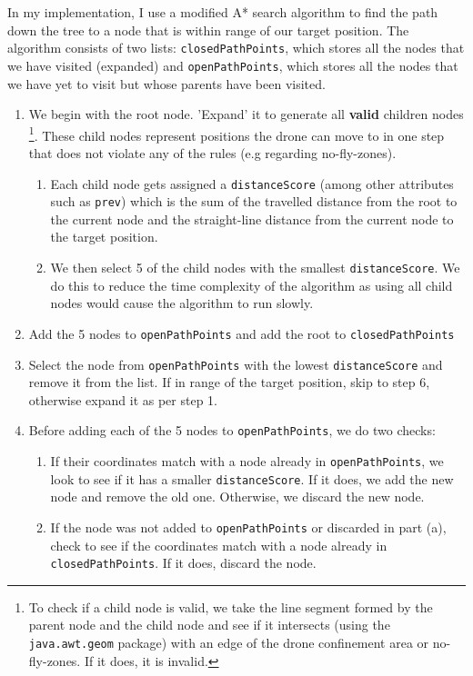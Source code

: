 \documentclass[11pt]{article}
\begin{document}
In my implementation, I use a modified A* search algorithm to find the path down the tree to a node that is within range of our target position. The algorithm consists of two lists: \texttt{closedPathPoints}, which stores all the nodes that we have visited (expanded) and \texttt{openPathPoints}, which stores all the nodes that we have yet to visit but whose parents have been visited.
\begin{enumerate}[topsep=0pt, itemsep=0pt]
  \item We begin with the root node. 'Expand' it to generate all \textbf{valid} children nodes \footnote{To check if a child node is valid, we take the line segment formed by the parent node and the child node and see if it intersects (using the \texttt{java.awt.geom} package) with an edge of the drone confinement area or no-fly-zones. If it does, it is invalid.}. These child nodes represent positions the drone can move to in one step that does not violate any of the rules (e.g regarding no-fly-zones).
  \begin{enumerate}[topsep=0pt, itemsep=0pt]
      \item Each child node gets assigned a \texttt{distanceScore} (among other attributes such as \texttt{prev}) which is the sum of the travelled distance from the root to the current node and the straight-line distance from the current node to the target position.
      \item We then select 5 of the child nodes with the smallest \texttt{distanceScore}. We do this to reduce the time complexity of the algorithm as using all child nodes would cause the algorithm to run slowly.
  \end{enumerate}
  
  \item Add the 5 nodes to \texttt{openPathPoints} and add the root to \texttt{closedPathPoints}
  
  \item Select the node from \texttt{openPathPoints} with the lowest \texttt{distanceScore} and remove it from the list. If in range of the target position, skip to step 6, otherwise expand it as per step 1.
  
  \item Before adding each of the 5 nodes to \texttt{openPathPoints}, we do two checks:
  \begin{enumerate}[topsep=0pt, itemsep=0pt]
      \item If their coordinates match with a node already in \texttt{openPathPoints}, we look to see if it has a smaller \texttt{distanceScore}. If it does, we add the new node and remove the old one. Otherwise, we discard the new node.
      \item If the node was not added to \texttt{openPathPoints} or discarded in part (a), check to see if the coordinates match with a node already in \texttt{closedPathPoints}. If it does, discard the node.      
    \end{enumerate}   
    

\end{enumerate}
\end{document}
